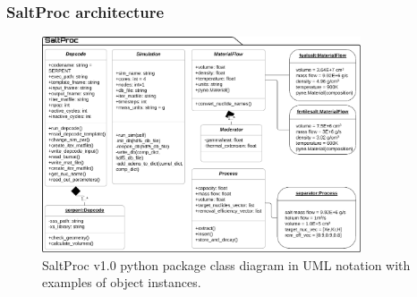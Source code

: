\documentclass[9pt]{beamer}
\begin{document}
\begin{frame}
\frametitle{SaltProc architecture}
\vspace{-2mm}
\begin{figure}[ht!] %
\includegraphics[width=0.84\textwidth]{../dissertation/figures/ch2/saltproc_class_diagram.png}
	\caption{SaltProc v1.0 python package class diagram in UML notation 
		with examples of object instances.}
\end{figure}
\end{frame}	
\end{document}
